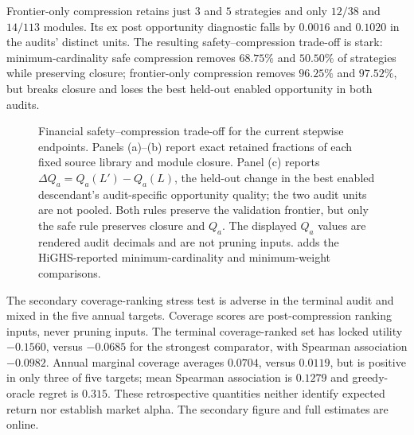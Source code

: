 Frontier-only compression retains just $3$ and $5$ strategies and only
$12/38$ and $14/113$ modules.  Its ex post opportunity diagnostic falls by
$0.0016$ and $0.1020$ in the audits' distinct units.  The resulting
safety--compression trade-off is stark: minimum-cardinality safe compression
removes $68.75\%$ and $50.50\%$ of strategies while preserving closure;
frontier-only compression removes $96.25\%$ and $97.52\%$, but breaks
closure and loses the best held-out enabled opportunity in both audits.

\begin{figure}[htbp]
  \centering
  \resizebox{\linewidth}{!}{%
  }
  \caption{Financial safety--compression trade-off for the current stepwise
  endpoints.  Panels (a)--(b) report exact retained fractions of each fixed
  source library and module closure.  Panel (c) reports
  \(\Delta Q_a=Q_a(L')-Q_a(L)\), the held-out change in the best enabled
  descendant's audit-specific opportunity quality; the two audit units are
  not pooled.  Both rules preserve the validation frontier, but only the safe
  rule preserves closure and \(Q_a\).  The displayed \(Q_a\) values are
  rendered audit decimals and are not pruning inputs.  
  adds the HiGHS-reported minimum-cardinality and minimum-weight comparisons.}
  \label{fig:financial-safe-compression}
\end{figure}

\FloatBarrier
The secondary coverage-ranking stress test is adverse in the terminal audit
and mixed in the five annual targets.
Coverage scores are post-compression ranking inputs, never pruning inputs.
The terminal coverage-ranked set has
locked utility $-0.1560$, versus $-0.0685$ for the strongest comparator,
with Spearman association $-0.0982$.  Annual marginal coverage averages
$0.0704$, versus $0.0119$, but is positive in only three of five targets;
mean Spearman association is $0.1279$ and greedy-oracle regret is $0.315$.
These retrospective quantities neither identify expected return nor establish
market alpha.  The secondary figure and full estimates are online.
